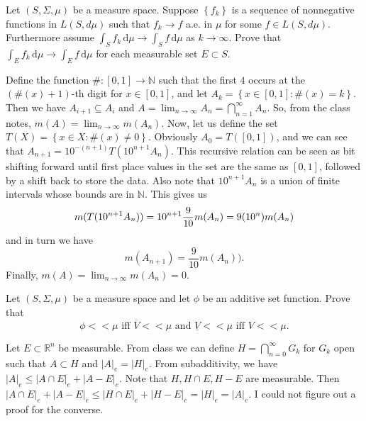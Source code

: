 \pagebreak

\begin{problem}{5}
  Let $\left( S, \Sigma, \mu \right)$ be a measure space.
  Suppose $\left\{ f_{k} \right\}$ is a sequence of nonnegative functions in $L\left( S, d \mu \right)$ such that $f_{k} \to f$ a.e. in $\mu$ for some $f\in L\left( S,d \mu \right)$.
  Furthermore assume $\int_{S} \! f_{k} \, \mathrm{d} \mu \to \int_{S} \! f \, \mathrm{d} \mu $ as $k \to \infty$.
  Prove that $\int_{E} \! f_{k} \, \mathrm{d} \mu \to \int_{E} \! f \, \mathrm{d} \mu  $ for each measurable set $E \subset S$.
\end{problem}

\begin{solution}
  Define the function $\# : [0,1] \to \mathbb{N} $ such that the first $4$ occurs at the $(\#(x)+1)$-th digit for $x \in [0,1]$, and let $A_{k} = \left\{ x\in[0,1] : \#(x) = k \right\}$.
  Then we have $A_{i+1} \subseteq A_{i}$ and $A = \lim_{n \to \infty} A_{n} = \bigcap_{n=1}^{ \infty } A_{n} $.
  So, from the class notes, $m(A) = \lim_{n \to \infty} m(A_{n})$.
  Now, let us define the set $T(X) = \left\{ x \in X : \#(x) \neq  0  \right\}$. 
  Obviously $A_{0} = T([0,1])$, and we can see that $A_{n+1} = 10^{-(n+1)}T(10^{n+1}A_{n})$.
  This recursive relation can be seen as bit shifting forward until first place values in the set are the same as $[0,1]$, followed by a shift back to store the data.
  Also note that $10^{n+1}A_{n}$ is a union of finite intervals whose bounds are in $\mathbb{N}$.
  This gives us
  \[
  m(T(10^{n+1}A_{n})) = 10^{n+1} \frac{9}{10} m(A_{n}) = 9(10^{n})m(A_{n}) \\
  \] 
  and in turn we have
  \[
  m(A_{n+1}) = \frac{9}{10}m(A_{n}))
  .\] 
  Finally, $m(A) = \lim_{n \to \infty} m(A_{n}) = 0$.
\end{solution}

\pagebreak

\begin{problem}{6}
  Let $\left( S, \Sigma, \mu \right)$ be a measure space and let $\phi$ be an additive set function.
  Prove that
  \[
  \phi < < \mu \text{ iff } \overline{V} < < \mu \text{ and } \underline{V} < < \mu \text{ iff } V < < \mu
  .\] 
\end{problem}

\begin{solution}
  Let $E \subset \mathbb{R}^{n}$ be measurable.
  From class we can define $H = \bigcap_{n=0}^{\infty} G_{k}$ for $G_{k}$ open such that $A \subset H$ and $\left| A \right|_{e} = \left| H \right|_{e}$.
  From subadditivity, we have $\left| A \right|_{e} \leq  \left| A \cap E \right|_{e} + \left| A - E \right|_{e}$.
  Note that $H,H\cap E,H - E$ are measurable.
  Then $\left| A \cap E \right|_{e} + \left| A - E \right|_{e} \leq \left| H \cap E \right|_{e} + \left| H - E \right|_{e} = \left| H \right|_{e} = \left| A \right|_{e}$.
  I could not figure out a proof for the converse.
\end{solution}
